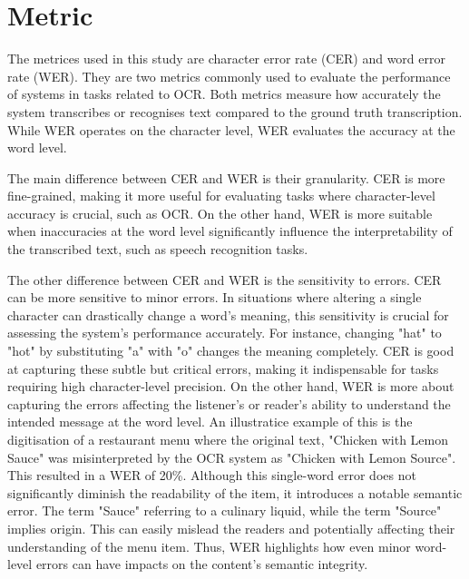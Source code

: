
\label{chap:5_results}

\section{Metric}
\label{sec:5_metric}
The metrices used in this study are character error rate (CER) and word error rate (WER). They are two metrics commonly used to evaluate the performance of systems in tasks related to OCR. Both metrics measure how accurately the system transcribes or recognises text compared to the ground truth transcription. While WER operates on the character level, WER evaluates the accuracy at the word level.

The main difference between CER and WER is their granularity. CER is more fine-grained, making it more useful for evaluating tasks where character-level accuracy is crucial, such as OCR. On the other hand, WER is more suitable when inaccuracies at the word level significantly influence the interpretability of the transcribed text, such as speech recognition tasks.

The other difference between CER and WER is the sensitivity to errors. CER can be more sensitive to minor errors. In situations where altering a single character can drastically change a word's meaning, this sensitivity is crucial for assessing the system's performance accurately. For instance, changing "hat" to "hot" by substituting "a" with "o" changes the meaning completely. CER is good at capturing these subtle but critical errors, making it indispensable for tasks requiring high character-level precision. On the other hand, WER is more about capturing the errors affecting the listener's or reader's ability to understand the intended message at the word level. An illustratice example of this is the digitisation of a restaurant menu where the original text, "Chicken with Lemon Sauce" was misinterpreted by the OCR system as "Chicken with Lemon Source". This resulted in a WER of 20\%. Although this single-word error does not significantly diminish the readability of the item, it introduces a notable semantic error. The term "Sauce" referring to a culinary liquid, while the term "Source" implies origin. This can easily mislead the readers and potentially affecting their understanding of the menu item. Thus, WER highlights how even minor word-level errors can have impacts on the content's semantic integrity.

